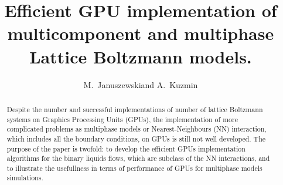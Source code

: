 \documentclass[mathpazo]{cicp}
\begin{document}
\title{Efficient GPU implementation of multicomponent and multiphase Lattice Boltzmann models.}

\author[M.~Januszewski and A.~Kuzmin]{M.~Januszewski\corrauth and A.~Kuzmin}
\address{\ Institute of Physics, University of Silesia, 40-007 Katowice, Poland\\
\ Department of Mechanical and Manufacturing Engineering,
Schulich School of Engineering,
University of Calgary, Canada
}



\begin{abstract}
Despite the number and successful implementations of number of lattice Boltzmann systems on Graphics Processing Units (GPUs), the implementation of more complicated problems as multiphase models or Nearest-Neighbours (NN) interaction, which includes all the boundary conditions, on GPUs is still not well developed. The purpose of the paper is twofold: to develop the efficient GPUs implementation algorithms for the binary liquids flows, which are subclass of the NN interactions, and to illustrate the usefullness in terms of performance of GPUs for multiphase models simulations.
\end{abstract}
\end{document}

